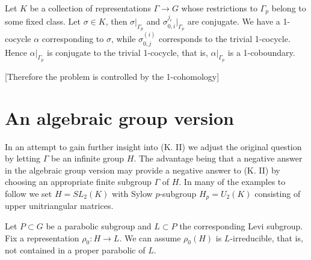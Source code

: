 Let $K$ be a collection of representations $\Gamma \rightarrow G$ whose restrictions to $\Gamma_p$ belong to some fixed class. Let $\sigma\in K$, then $\sigma|_{\Gamma_p}$ and $\sigma^{j_i}_{0,i}|_{\Gamma_p}$ are conjugate. We have a 1-cocycle $\alpha$ corresponding to $\sigma$, while $\sigma_{0,j}^{(i)}$ corresponds to the trivial 1-cocycle. Hence $\alpha|_{\Gamma_p}$ is conjugate to the trivial 1-cocycle, that is, $\alpha|_{\Gamma_p}$ is a 1-coboundary. 

% 
% 
% 
% 

[Therefore the problem is controlled by the 1-cohomology]

\section{An algebraic group version}

In an attempt to gain further insight into (K. II) we adjust the original question by letting $\Gamma$ be an infinite group $H$. The advantage being that a negative answer in the algebraic group version may provide a negative answer to (K. II) by choosing an appropriate finite subgroup $\Gamma$ of $H$. In many of the examples to follow we set $H = SL_2(K)$ with Sylow $p$-subgroup $H_p = U_2(K)$ consisting of upper unitriangular matrices. 

Let $P \subset G$ be a parabolic subgroup and $L \subset P$ the corresponding Levi subgroup. Fix a representation $\rho_0:H\rightarrow L$. We can assume $\rho_0(H)$ is $L$-irreducible, that is, not contained in a proper parabolic of $L$. 

